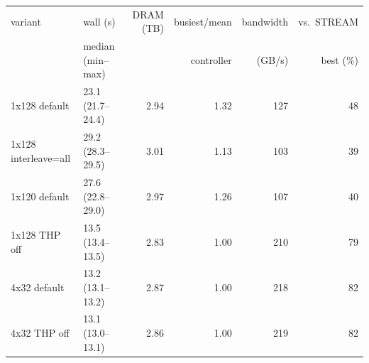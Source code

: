 \begin{tabular}{llrrrr}
\toprule
variant & wall (s) & DRAM (TB) & busiest/mean & bandwidth & vs.\ STREAM \\
 & median (min--max) & & controller & (GB/s) & best (\%) \\
\midrule
1x128 default & 23.1 (21.7--24.4) & 2.94 & 1.32 & 127 & 48 \\
1x128 interleave=all & 29.2 (28.3--29.5) & 3.01 & 1.13 & 103 & 39 \\
1x120 default & 27.6 (22.8--29.0) & 2.97 & 1.26 & 107 & 40 \\
1x128 THP off & 13.5 (13.4--13.5) & 2.83 & 1.00 & 210 & 79 \\
4x32 default & 13.2 (13.1--13.2) & 2.87 & 1.00 & 218 & 82 \\
4x32 THP off & 13.1 (13.0--13.1) & 2.86 & 1.00 & 219 & 82 \\
\bottomrule
\end{tabular}
